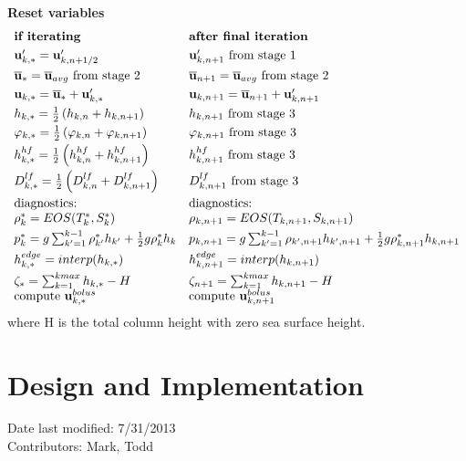 \documentclass[11pt]{report}
\newcommand{\bea}{\begin{eqnarray}}
\newcommand{\eea}{\end{eqnarray}}
\begin{document}
{\bf Reset variables}
\bea 
\begin{array}{ll}
\mbox{\bf if iterating} & \mbox{\bf after final iteration}\smallskip\\
{\bf u}'_{k,*} = {\bf u}'_{k,n+1/2} & {\bf u}'_{k,n+1} \mbox{ from stage 1}\smallskip\\
\ubtr_{*} = \ubtr_{avg} \mbox{ from stage 2} & \ubtr_{n+1} = \ubtr_{avg} \mbox{ from stage 2}\smallskip\\
{\bf u}_{k,*} = \ubtr_{*} + {\bf u}'_{k,*} & {\bf u}_{k,n+1} = \ubtr_{n+1} + {\bf u}'_{k,n+1}\smallskip\\
h_{k,*} = \frac{1}{2}\left(h_{k,n} +h_{k,n+1}\right)  
 & h_{k,n+1} \mbox{ from stage 3} \smallskip\\
\varphi_{k,*} = \frac{1}{2}\left(\varphi_{k,n} +\varphi_{k,n+1}\right)
 & \varphi_{k,n+1} \mbox{ from stage 3} \smallskip\\
h^{hf}_{k,*} = \frac{1}{2}\left(h^{hf}_{k,n} +h^{hf}_{k,n+1}\right) 
&  h^{hf}_{k,n+1} \mbox{ from stage 3}  \smallskip\\
D^{lf}_{k,*} = \frac{1}{2}\left(D^{lf}_{k,n} +D^{lf}_{k,n+1}\right) &
D^{lf}_{k,n+1} \mbox{ from stage 3}\smallskip\\ \label{rho3}
\mbox{diagnostics:}
& \mbox{diagnostics:} \\
{\rho}_k^* = EOS(T^*_k, S^*_k) 
 & {\rho}_{k,n+1} = EOS(T_{k,n+1}, S_{k,n+1}) \smallskip\\
\label{p3}
{p}_k^* =  g\sum_{k'=1}^{k-1} 
{\rho}_{k'}^* h_{k'}
+ \frac{1}{2}g{\rho}_{k}^* h_k
 & {p}_{k,n+1} =  g\sum_{k'=1}^{k-1} 
{\rho}_{k',n+1} h_{k',n+1}
+ \frac{1}{2}g{\rho}_{k,n+1}^* h_{k,n+1} \smallskip \\
h^{edge}_{k,*} = interp(h_{k,*}) & 
h^{edge}_{k,n+1} = interp(h_{k,n+1}) \smallskip\\
\zeta_* = \sum_{k=1}^{kmax}h_{k,*} - H &
\zeta_{n+1} = \sum_{k=1}^{kmax}h_{k,n+1} - H \\
\mbox{compute }{\bf u}_{k,*}^{bolus} &
\mbox{compute }{\bf u}_{k,n+1}^{bolus} 
\end{array}
\eea
where H is the total column height with zero sea surface height.


\chapter{Design and Implementation}
Date last modified: 7/31/2013 \\
Contributors: Mark, Todd \\
\end{document}
